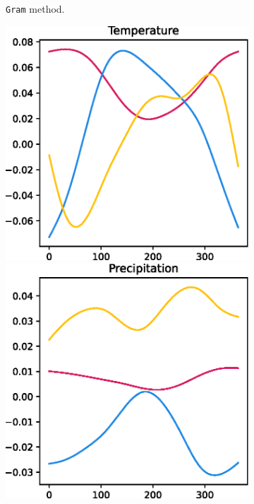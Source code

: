 \begin{figure}
\begin{subfigure}[b]{0.3\textwidth}
    \caption{\texttt{Gram} method.}
    \end{subfigure}
    \hfill
    \begin{subfigure}[b]{0.3\textwidth}
    \centering
    \includegraphics[width=\textwidth]{figures/eigen_temp_cov.eps}
    \includegraphics[width=\textwidth]{figures/eigen_prec_cov.eps}

\end{subfigure}
\end{figure}
